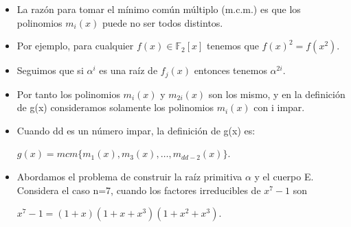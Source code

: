 \begin{frame}  \small  
\begin{itemize} 

\item  La razón para tomar el mínimo común múltiplo (m.c.m.) es que los polinomios $m_i(x)$ puede no ser todos distintos.

\item Por ejemplo, para cualquier $f(x) \in \mathbb{F}_2[x]$ tenemos que $f(x)^2=f(x^2)$. 

\item Seguimos que si $\alpha^i$ es una raíz de $f_j(x)$ entonces tenemos $\alpha^{2i}$.

\item Por tanto los polinomios $m_i(x)$ y $m_{2i}(x)$ son los mismo, y en la definición de g(x) consideramos solamente los polinomios $m_i(x)$ con i impar. 

\item Cuando dd es un número impar, la definición de g(x) es:

\begin{center}
$g(x) = mcm 	\{m_1(x), m_3(x), \ldots , m_{dd-2}(x)\}.$
\end{center}

\item Abordamos el problema de construir la raíz primitiva $\alpha$ y el cuerpo E. Considera el caso n=7, cuando los factores irreducibles de $x^7-1$ son

\begin{center}
$x^7 -1=(1+x)(1+x+x^3)(1+x^2 +x^3).$
\end{center}

\end{itemize} 


\end{frame} 

